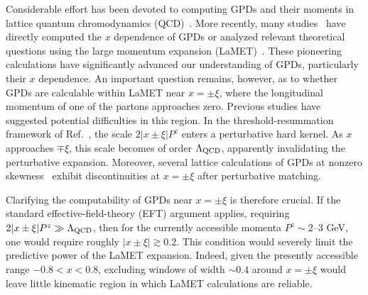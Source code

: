 \documentclass[prl,aps,twocolumn,preprintnumbers, showpacs, nofootinbib,superscriptaddress,notitlepage]{revtex4-1}
\begin{document}
Considerable effort has been devoted to computing GPDs and their moments in lattice quantum chromodynamics (QCD)~\cite{Cichy:2026xrh}. More recently, many studies~\cite{Ji:2015qla,Xiong:2015nua,Chen:2019lcm,Alexandrou:2019dax,Liu:2019urm,Lin:2020rxa,Alexandrou:2020zbe,Bhattacharya:2020xlt,Bhattacharya:2020jfj,Alexandrou:2021bbo,Lin:2021brq,Scapellato:2022mai,Bhattacharya:2022aob,Ma:2022ggj,Ma:2022gty,Yao:2022vtp,Bhattacharya:2023nmv,Bhattacharya:2023jsc,Braun:2023alc,Lin:2023gxz,Holligan:2023jqh,Ding:2024saz,Braun:2024snf,Chu:2025jsi,Holligan:2025baj,Chu:2025kew,Bhattacharya:2025yba} have directly computed the $x$ dependence of GPDs or analyzed relevant theoretical questions using the large momentum expansion (LaMET)~\cite{Ji:2013dva,Ji:2014gla,Ji:2020byp,Ji:2022ezo,Ji:2024oka}. These pioneering calculations have significantly advanced our understanding of GPDs, particularly their $x$ dependence. An important question remains, however, as to whether GPDs are calculable within LaMET near $x=\pm\xi$, where the longitudinal momentum of one of the partons approaches zero. Previous studies have suggested potential difficulties in this region. In the threshold-resummation framework of Ref.~\cite{Holligan:2025baj}, the scale $2|x\pm\xi|P^z$ enters a perturbative hard kernel. As $x$ approaches $\mp\xi$, this scale becomes of order $\Lambda_{\rm QCD}$, apparently invalidating the perturbative expansion. Moreover, several lattice calculations of GPDs at nonzero skewness~\cite{Alexandrou:2020zbe,Alexandrou:2021bbo,Holligan:2023jqh,Chu:2025kew} exhibit discontinuities at $x=\pm\xi$ after perturbative matching.

Clarifying the computability of GPDs near $x=\pm\xi$ is therefore crucial. 
If the standard effective-field-theory (EFT) argument applies, requiring
$2|x\pm\xi|P^z\gg\Lambda_{\rm QCD}$, then for the currently accessible 
momenta $P^z\sim 2$--$3$ GeV, one would require roughly 
$|x\pm\xi|\gtrsim 0.2$. This condition would severely limit the predictive 
power of the LaMET expansion. Indeed, given the presently accessible range 
$-0.8<x<0.8$, excluding windows of width $\sim0.4$ around $x=\pm\xi$ would 
leave little kinematic region in which LaMET calculations are reliable.
\end{document}
